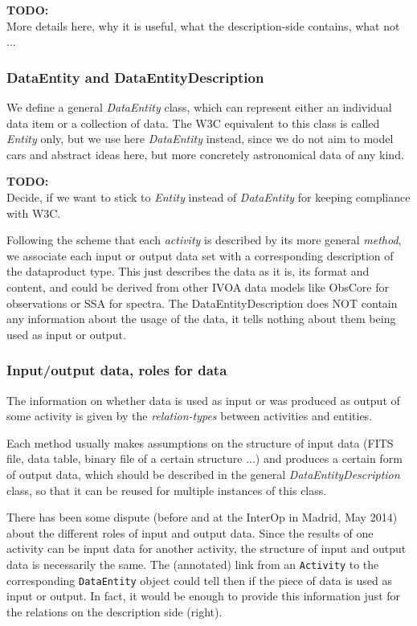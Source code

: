 \documentclass[11pt,a4paper]{ivoa}
\newcommand{\TODO}[1]{%
    \noindent%
    \colorbox{todocolor}{%
            \parbox{0.85\linewidth}{\sffamily \textbf{TODO:}\\
            #1}
    }%
    \vspace{2pt}

}
\begin{document}
\TODO{More details here, why it is useful, what the description-side contains, what not ...}

\subsubsection{DataEntity and DataEntityDescription}
We define a general \emph{DataEntity} class, 
which can represent either an individual data item or a collection of data. The W3C equivalent to this class is called \emph{Entity} only, but we use here \emph{DataEntity} instead, since we do not aim to model cars and abstract ideas here, but more concretely astronomical data of any kind.

\TODO{Decide, if we want to stick to \emph{Entity} instead of \emph{DataEntity} for keeping 
compliance with W3C.}

Following the scheme that each \emph{activity} is described
by its more general \emph{method}, we associate each input or
output data set with a corresponding description of the dataproduct type. 
This just describes the data as it is, its format and content, and could be derived
from other IVOA data models like ObsCore for observations or SSA for spectra.
The DataEntityDescription does NOT contain any information about the usage of the data, 
it tells nothing about them being used as input or output.

\subsubsection{Input/output data, roles for data}
The information on whether data is used as input or was produced as output of 
some activity is given by the \emph{relation-types} between activities and entities.

Each method usually makes assumptions on the structure of input data (FITS file, data
table, binary file of a certain structure ...) and produces a certain form of
output data, which should be described in the general \emph{DataEntityDescription}
class, so that it can be reused for multiple instances of this class.

There has been some dispute (before and at the InterOp in Madrid, May 2014) 
about the different roles of input and output data. Since the results of one 
activity can be input data for
another activity, the structure of input and output data is necessarily the same.
The (annotated) link from an \texttt{Activity} to the corresponding \texttt{DataEntity}
object could tell then if the piece of data is used as input or output. In fact, 
it would be enough to provide this information just for the relations on the description side (right).
\end{document}
